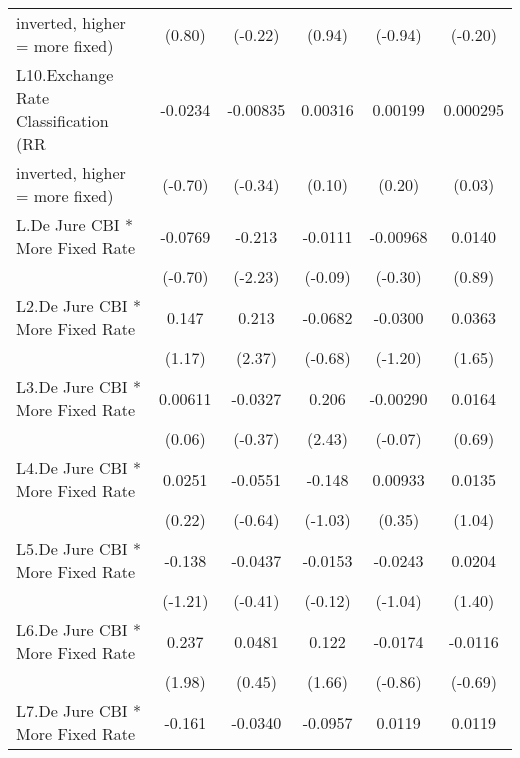 {\begin{tabular}{l*{5}{c}}
inverted, higher = more fixed)          &(0.80)         &(-0.22)         &(0.94)         &(-0.94)         &(-0.20)         \\
\addlinespace
L10.Exchange Rate Classification (RR    &-0.0234         &-0.00835         &0.00316         &0.00199         &0.000295         \\
inverted, higher = more fixed)          &(-0.70)         &(-0.34)         &(0.10)         &(0.20)         &(0.03)         \\
\addlinespace
L.De Jure CBI * More Fixed Rate         &-0.0769         &-0.213\sym{*}  &-0.0111         &-0.00968         &0.0140         \\
                                        &(-0.70)         &(-2.23)         &(-0.09)         &(-0.30)         &(0.89)         \\
\addlinespace
L2.De Jure CBI * More Fixed Rate        &0.147         &0.213\sym{*}  &-0.0682         &-0.0300         &0.0363         \\
                                        &(1.17)         &(2.37)         &(-0.68)         &(-1.20)         &(1.65)         \\
\addlinespace
L3.De Jure CBI * More Fixed Rate        &0.00611         &-0.0327         &0.206\sym{*}  &-0.00290         &0.0164         \\
                                        &(0.06)         &(-0.37)         &(2.43)         &(-0.07)         &(0.69)         \\
\addlinespace
L4.De Jure CBI * More Fixed Rate        &0.0251         &-0.0551         &-0.148         &0.00933         &0.0135         \\
                                        &(0.22)         &(-0.64)         &(-1.03)         &(0.35)         &(1.04)         \\
\addlinespace
L5.De Jure CBI * More Fixed Rate        &-0.138         &-0.0437         &-0.0153         &-0.0243         &0.0204         \\
                                        &(-1.21)         &(-0.41)         &(-0.12)         &(-1.04)         &(1.40)         \\
\addlinespace
L6.De Jure CBI * More Fixed Rate        &0.237\sym{*}  &0.0481         &0.122         &-0.0174         &-0.0116         \\
                                        &(1.98)         &(0.45)         &(1.66)         &(-0.86)         &(-0.69)         \\
\addlinespace
L7.De Jure CBI * More Fixed Rate        &-0.161         &-0.0340         &-0.0957         &0.0119         &0.0119         \\

\end{tabular}}
